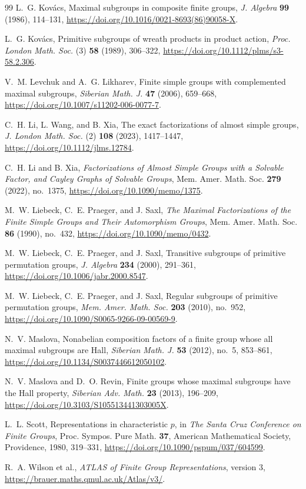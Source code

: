 \documentclass[11pt]{amsart}
\theoremstyle{definition}
\begin{document}
\begin{thebibliography}{99}
L.~G. Kov\'acs,
Maximal subgroups in composite finite groups,
\emph{J. Algebra} \textbf{99} (1986), 114--131,
\url{https://doi.org/10.1016/0021-8693(86)90058-X}.

L.~G. Kov\'acs,
Primitive subgroups of wreath products in product action,
\emph{Proc. London Math. Soc.} (3) \textbf{58} (1989), 306--322,
\url{https://doi.org/10.1112/plms/s3-58.2.306}.

V.~M. Levchuk and A.~G. Likharev,
Finite simple groups with complemented maximal subgroups,
\emph{Siberian Math. J.} \textbf{47} (2006), 659--668,
\url{https://doi.org/10.1007/s11202-006-0077-7}.

C.~H. Li, L. Wang, and B. Xia,
The exact factorizations of almost simple groups,
\emph{J. London Math. Soc.} (2) \textbf{108} (2023), 1417--1447,
\url{https://doi.org/10.1112/jlms.12784}.

C.~H. Li and B. Xia,
\emph{Factorizations of Almost Simple Groups with a Solvable Factor, and
Cayley Graphs of Solvable Groups},
Mem. Amer. Math. Soc. \textbf{279} (2022), no.~1375,
\url{https://doi.org/10.1090/memo/1375}.

M.~W. Liebeck, C.~E. Praeger, and J. Saxl,
\emph{The Maximal Factorizations of the Finite Simple Groups and Their
Automorphism Groups},
Mem. Amer. Math. Soc. \textbf{86} (1990), no.~432,
\url{https://doi.org/10.1090/memo/0432}.

M.~W. Liebeck, C.~E. Praeger, and J. Saxl,
Transitive subgroups of primitive permutation groups,
\emph{J. Algebra} \textbf{234} (2000), 291--361,
\url{https://doi.org/10.1006/jabr.2000.8547}.

M.~W. Liebeck, C.~E. Praeger, and J. Saxl,
Regular subgroups of primitive permutation groups,
\emph{Mem. Amer. Math. Soc.} \textbf{203} (2010), no.~952,
\url{https://doi.org/10.1090/S0065-9266-09-00569-9}.

N.~V. Maslova,
Nonabelian composition factors of a finite group whose all maximal subgroups
are Hall,
\emph{Siberian Math. J.} \textbf{53} (2012), no.~5, 853--861,
\url{https://doi.org/10.1134/S0037446612050102}.

N.~V. Maslova and D.~O. Revin,
Finite groups whose maximal subgroups have the Hall property,
\emph{Siberian Adv. Math.} \textbf{23} (2013), 196--209,
\url{https://doi.org/10.3103/S105513441303005X}.

L.~L. Scott,
Representations in characteristic \(p\),
in \emph{The Santa Cruz Conference on Finite Groups},
Proc. Sympos. Pure Math. \textbf{37}, American Mathematical Society,
Providence, 1980, 319--331,
\url{https://doi.org/10.1090/pspum/037/604599}.

R.~A. Wilson et al.,
\emph{ATLAS of Finite Group Representations}, version 3,
\url{https://brauer.maths.qmul.ac.uk/Atlas/v3/}.

\end{thebibliography}
\end{document}
